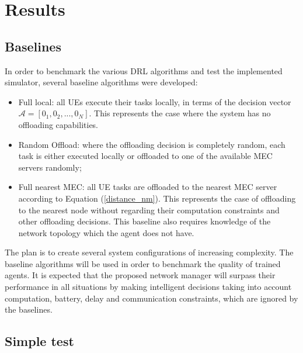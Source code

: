\chapter{Results}

\section{Baselines} \label{baselines}
\noindent In order to benchmark the various \acrshort{DRL} algorithms and test the implemented simulator, several baseline algorithms were developed:

\begin{itemize}
    \item Full local: all \acrshort{UE}s execute their tasks locally, in terms of the decision vector $\mathcal{A}=[0_1, 0_2, ..., 0_N]$. This represents the case where the system has no offloading capabilities.
    \item Random Offload: where the offloading decision is completely random, each task is either executed locally or offloaded to one of the available \acrshort{MEC} servers randomly;
    \item Full nearest \acrshort{MEC}: all \acrshort{UE} tasks are offloaded to the nearest \acrshort{MEC} server according to Equation (\ref{distance_nm}). This represents the case of offloading to the nearest node without regarding their computation constraints and other offloading decisions. This baseline also requires knowledge of the network topology which the agent does not have.
\end{itemize}

The plan is to create several system configurations of increasing complexity. The baseline algorithms will be used in order to benchmark the quality of trained agents. It is expected that the proposed network manager will surpass their performance in all situations by making intelligent decisions taking into account computation, battery, delay and communication constraints, which are ignored by the baselines.

\section{Simple test} \label{simple_test}

